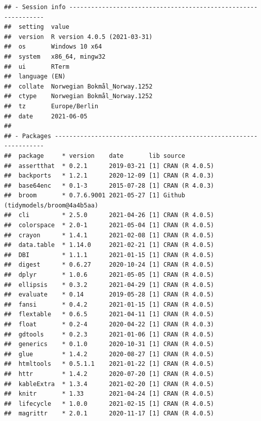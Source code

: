 \documentclass[
  11pt,
]{article}
\begin{document}
\begin{verbatim}
## - Session info ---------------------------------------------------------------
##  setting  value                       
##  version  R version 4.0.5 (2021-03-31)
##  os       Windows 10 x64              
##  system   x86_64, mingw32             
##  ui       RTerm                       
##  language (EN)                        
##  collate  Norwegian Bokmål_Norway.1252
##  ctype    Norwegian Bokmål_Norway.1252
##  tz       Europe/Berlin               
##  date     2021-06-05                  
## 
## - Packages -------------------------------------------------------------------
##  package     * version    date       lib source                           
##  assertthat  * 0.2.1      2019-03-21 [1] CRAN (R 4.0.5)                   
##  backports   * 1.2.1      2020-12-09 [1] CRAN (R 4.0.3)                   
##  base64enc   * 0.1-3      2015-07-28 [1] CRAN (R 4.0.3)                   
##  broom       * 0.7.6.9001 2021-05-27 [1] Github (tidymodels/broom@4a4b5aa)
##  cli         * 2.5.0      2021-04-26 [1] CRAN (R 4.0.5)                   
##  colorspace  * 2.0-1      2021-05-04 [1] CRAN (R 4.0.5)                   
##  crayon      * 1.4.1      2021-02-08 [1] CRAN (R 4.0.5)                   
##  data.table  * 1.14.0     2021-02-21 [1] CRAN (R 4.0.5)                   
##  DBI         * 1.1.1      2021-01-15 [1] CRAN (R 4.0.5)                   
##  digest      * 0.6.27     2020-10-24 [1] CRAN (R 4.0.5)                   
##  dplyr       * 1.0.6      2021-05-05 [1] CRAN (R 4.0.5)                   
##  ellipsis    * 0.3.2      2021-04-29 [1] CRAN (R 4.0.5)                   
##  evaluate    * 0.14       2019-05-28 [1] CRAN (R 4.0.5)                   
##  fansi       * 0.4.2      2021-01-15 [1] CRAN (R 4.0.5)                   
##  flextable   * 0.6.5      2021-04-11 [1] CRAN (R 4.0.5)                   
##  float       * 0.2-4      2020-04-22 [1] CRAN (R 4.0.3)                   
##  gdtools     * 0.2.3      2021-01-06 [1] CRAN (R 4.0.5)                   
##  generics    * 0.1.0      2020-10-31 [1] CRAN (R 4.0.5)                   
##  glue        * 1.4.2      2020-08-27 [1] CRAN (R 4.0.5)                   
##  htmltools   * 0.5.1.1    2021-01-22 [1] CRAN (R 4.0.5)                   
##  httr        * 1.4.2      2020-07-20 [1] CRAN (R 4.0.5)                   
##  kableExtra  * 1.3.4      2021-02-20 [1] CRAN (R 4.0.5)                   
##  knitr       * 1.33       2021-04-24 [1] CRAN (R 4.0.5)                   
##  lifecycle   * 1.0.0      2021-02-15 [1] CRAN (R 4.0.5)                   
##  magrittr    * 2.0.1      2020-11-17 [1] CRAN (R 4.0.5)                   

\end{verbatim}
\end{document}
